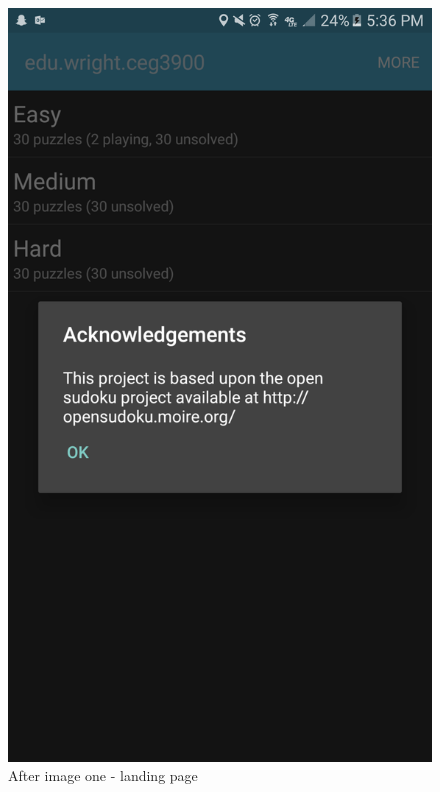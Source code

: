 \documentclass[10pt]{article}
\begin{document}
\begin{figure}
\includegraphics[width=\linewidth]{img/after1.png}
\caption{After image one - landing page}
\end{figure}
\end{document}

